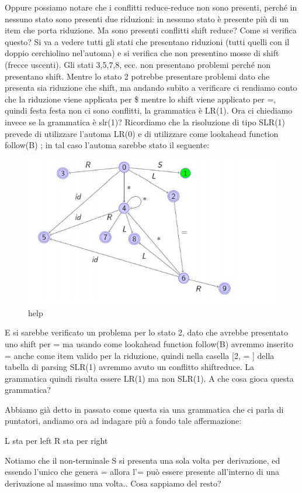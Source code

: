\documentclass[class=book, crop=false, oneside, 12pt]{standalone}
\begin{document}
Oppure possiamo notare che i conflitti reduce-reduce non sono presenti, perché in nessuno stato
sono presenti due riduzioni: in nessuno stato è presente più di un item che porta riduzione.
Ma sono presenti conflitti shift reduce?
Come si verifica questo?
Si va a vedere tutti gli stati che presentano riduzioni (tutti quelli con il doppio cerchiolino
nel'automa) e si verifica che non presentino mosse di shift (frecce uscenti).
Gli stati 3,5,7,8, ecc. non presentano problemi perché non presentano shift.
Mentre lo stato 2 potrebbe presentare problemi dato che presenta sia riduzione che shift, ma
andando subito a verificare ci rendiamo conto che la riduzione viene applicata per \$ mentre lo shift
viene applicato per =, quindi festa festa non ci sono conflitti, la grammatica è LR(1).
Ora ci chiediamo invece se la grammatica è slr(1)?
Ricordiamo che la risoluzione di tipo SLR(1) prevede di utilizzare l'automa LR(0) e di utilizzare come 
lookahead function follow(B) ; in tal caso l'automa sarebbe stato il seguente:
\begin{figure}[H]
    \centering
    \includegraphics[width=.8\textwidth]{send_help_5.png}
    \caption{help}
\end{figure}
E si sarebbe verificato un problema per lo stato 2, dato che avrebbe presentato uno shift per = ma
usando come lookahead function follow(B) avremmo inserito = anche come item valido per la
riduzione, quindi nella casella [2, = ] della tabella di parsing SLR(1) avremmo avuto un conflitto shiftreduce.
La grammatica quindi risulta essere LR(1) ma non SLR(1).
A che cosa gioca questa grammatica?

Abbiamo già detto in passato come questa sia una grammatica che ci parla di puntatori, andiamo ora
ad indagare più a fondo tale affermazione:

L sta per left
R sta per right

Notiamo che il non-terminale S si presenta una sola volta per derivazione, ed essendo l'unico che
genera = allora l'= può essere presente all'interno di una derivazione al massimo una volta.. Cosa
sappiamo del resto?
\end{document}
